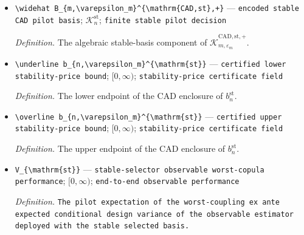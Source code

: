 \documentclass{article}
\begin{document}
\begin{itemize}
  \par\smallskip\noindent\emph{Definition.} \texttt{The empirical stable-\allowbreak{}value,\allowbreak{} basis,\allowbreak{} rank,\allowbreak{} spectral,\allowbreak{} coordinate,\allowbreak{} and population stability-\allowbreak{}price record.}
  \item \texttt{\textbackslash{}\allowbreak{}widehat B\_\allowbreak{}\{m,\allowbreak{}\textbackslash{}\allowbreak{}varepsilon\_\allowbreak{}m\}\allowbreak{}\textasciicircum{}\{\textbackslash{}\allowbreak{}mathrm\{CAD,\allowbreak{}st\}\allowbreak{},\allowbreak{}+\allowbreak{}\}\allowbreak{}} --- \texttt{encoded stable CAD pilot basis}; \(\mathcal K_n^{\mathrm{st}}\); \texttt{finite stable pilot decision}
  \par\smallskip\noindent\emph{Definition.} The algebraic stable-basis component of \(\widehat{\mathscr K}_{m,\varepsilon_m}^{\mathrm{CAD,st},+}\).
  \item \texttt{\textbackslash{}\allowbreak{}underline b\_\allowbreak{}\{n,\allowbreak{}\textbackslash{}\allowbreak{}varepsilon\_\allowbreak{}m\}\allowbreak{}\textasciicircum{}\{\textbackslash{}\allowbreak{}mathrm\{st\}\allowbreak{}\}\allowbreak{}} --- \texttt{certified lower stability-\allowbreak{}price bound}; \([0,\infty)\); \texttt{stability-\allowbreak{}price certificate field}
  \par\smallskip\noindent\emph{Definition.} The lower endpoint of the CAD enclosure of \(b_n^{\mathrm{st}}\).
  \item \texttt{\textbackslash{}\allowbreak{}overline b\_\allowbreak{}\{n,\allowbreak{}\textbackslash{}\allowbreak{}varepsilon\_\allowbreak{}m\}\allowbreak{}\textasciicircum{}\{\textbackslash{}\allowbreak{}mathrm\{st\}\allowbreak{}\}\allowbreak{}} --- \texttt{certified upper stability-\allowbreak{}price bound}; \([0,\infty)\); \texttt{stability-\allowbreak{}price certificate field}
  \par\smallskip\noindent\emph{Definition.} The upper endpoint of the CAD enclosure of \(b_n^{\mathrm{st}}\).
  \item \texttt{V\_\allowbreak{}\{\textbackslash{}\allowbreak{}mathrm\{st\}\allowbreak{}\}\allowbreak{}} --- \texttt{stable-\allowbreak{}selector observable worst-\allowbreak{}copula performance}; \([0,\infty)\); \texttt{end-\allowbreak{}to-\allowbreak{}end observable performance}
  \par\smallskip\noindent\emph{Definition.} \texttt{The pilot expectation of the worst-\allowbreak{}coupling ex ante expected conditional design variance of the observable estimator deployed with the stable selected basis.}
\end{itemize}
\end{document}
